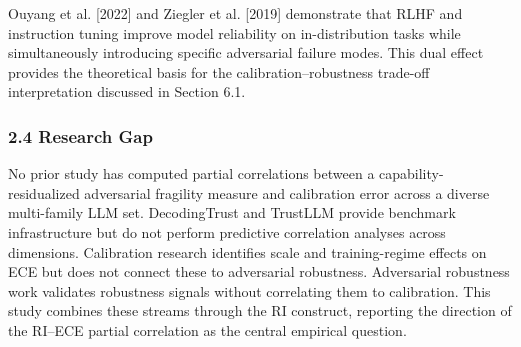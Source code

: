 Ouyang et al. [2022] and Ziegler et al. [2019] demonstrate that RLHF and instruction tuning improve model reliability on in-distribution tasks while simultaneously introducing specific adversarial failure modes. This dual effect provides the theoretical basis for the calibration–robustness trade-off interpretation discussed in Section 6.1.

\subsubsection{2.4 Research Gap}

No prior study has computed partial correlations between a capability-residualized adversarial fragility measure and calibration error across a diverse multi-family LLM set. DecodingTrust and TrustLLM provide benchmark infrastructure but do not perform predictive correlation analyses across dimensions. Calibration research identifies scale and training-regime effects on ECE but does not connect these to adversarial robustness. Adversarial robustness work validates robustness signals without correlating them to calibration. This study combines these streams through the RI construct, reporting the direction of the RI–ECE partial correlation as the central empirical question.

